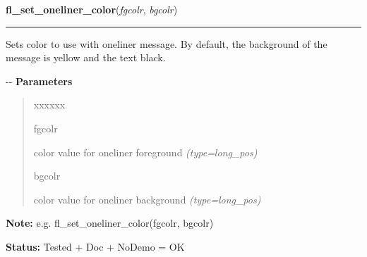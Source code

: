     \label{xformslib:flgoodies:fl_set_oneliner_color}

    \vspace{0.5ex}

\hspace{.8\funcindent}\begin{boxedminipage}{\funcwidth}

    \raggedright \textbf{fl\_set\_oneliner\_color}(\textit{fgcolr}, \textit{bgcolr})

    \vspace{-1.5ex}

    \rule{\textwidth}{0.5\fboxrule}
\setlength{\parskip}{2ex}

Sets color to use with oneliner message. By default, the background
of the message is yellow and the text black.

-{}-
\setlength{\parskip}{1ex}
      \textbf{Parameters}
      \vspace{-1ex}

      \begin{quote}
        \begin{Ventry}{xxxxxx}

          \item[fgcolr]


color value for oneliner foreground
            {\it (type=long\_pos)}

          \item[bgcolr]


color value for oneliner background
            {\it (type=long\_pos)}

        \end{Ventry}

      \end{quote}

\textbf{Note:} 
e.g. fl\_set\_oneliner\_color(fgcolr, bgcolr)


\textbf{Status:} 
Tested + Doc + NoDemo = OK


    \end{boxedminipage}

    \label{xformslib:flgoodies:fl_set_tooltip_font}

    \vspace{0.5ex}

